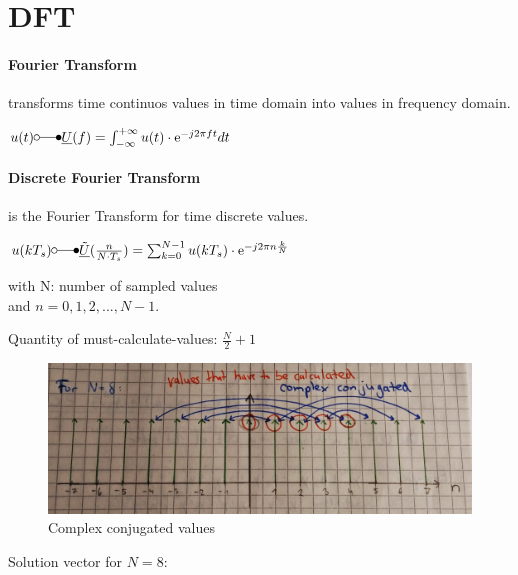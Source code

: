 \section{DFT}

\paragraph{Fourier Transform}
transforms time continuos values in time domain into values in frequency domain.

\(u(t) \laplace \underline{U}(f)=\int_{-\infty}^{+\infty}u(t) \cdot \euler^{-j 2 \pi f t} dt \)

\paragraph{Discrete Fourier Transform} 
is the Fourier Transform for time discrete values.

\( u(kT_s) \laplace  \underline{\tilde{U}}(\frac{n}{N \cdot T_s})= \sum_{k=0}^{N-1} u(kT_s) \cdot \euler^{-j 2 \pi n \frac{k}{N}} \)

with N: number of sampled values \\and \(n = 0, 1, 2, ... , N-1\).

Quantity of must-calculate-values: $\frac{N}{2} + 1$ 

\begin{figure}
	\centering
	\includegraphics[width=0.9\linewidth]{images/mirrorValues}
	\caption{Complex conjugated values}
	\label{fig:mirrorValues}
\end{figure}

Solution vector for $N=8$:

